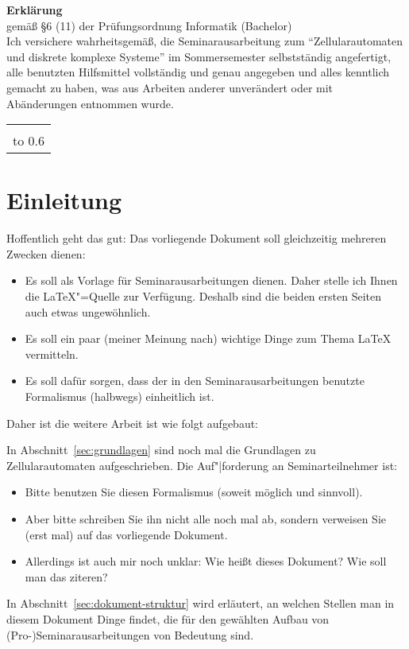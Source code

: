 {\thispagestyle{empty}\raggedright

\noindent \textbf{\Large Erklärung}\\[1ex]
gemäß \S 6 (11) der Prüfungsordnung Informatik %
(Bachelor) %
\\[\baselineskip]

\noindent
Ich versichere wahrheitsgemäß, die Seminarausarbeitung zum
\seminarart{} "`Zellularautomaten und diskrete komplexe Systeme"' im
Sommersemester \seminarjahr{} selbstständig angefertigt, alle
benutzten Hilfsmittel vollständig und genau angegeben und alles
kenntlich gemacht zu haben, was aus Arbeiten anderer unverändert oder
mit Abänderungen entnommen wurde.

\vspace*{30mm}
\noindent
\begin{tabular}{@{}l}
  \hline
   \\[-1ex]
  \hbox to 0.6\textwidth{(\teilnehmername, Matr.nr.~\teilnehmermatrnr) \hss}
\end{tabular}
}
\clearpage

\section{Einleitung}

Hoffentlich geht das gut: Das vorliegende Dokument soll gleichzeitig mehreren
Zwecken dienen:
%
\begin{itemize}[noitemsep]
\item Es soll als Vorlage für Seminarausarbeitungen dienen.
  Daher stelle ich Ihnen die \LaTeX"=Quelle zur Verfügung.
  Deshalb sind die beiden ersten Seiten auch etwas ungewöhnlich.
\item Es soll ein paar (meiner Meinung nach) wichtige Dinge zum Thema \LaTeX{}
  vermitteln.
\item Es soll dafür sorgen, dass der in den Seminarausarbeitungen benutzte
  Formalismus (halbwegs) einheitlich ist.
\end{itemize}
%
Daher ist die weitere Arbeit ist wie folgt aufgebaut: 

In Abschnitt~\ref{sec:grundlagen} sind noch mal die Grundlagen zu
Zellularautomaten aufgeschrieben. Die Auf"|forderung an Seminarteilnehmer ist:
%
\begin{itemize}[noitemsep]
\item Bitte benutzen Sie diesen Formalismus (soweit möglich und sinnvoll).
\item Aber bitte schreiben Sie ihn nicht alle noch mal ab, sondern verweisen
  Sie (erst mal) auf das vorliegende Dokument.
\item Allerdings ist auch mir noch unklar: Wie heißt dieses Dokument? Wie soll
  man das ziteren?
\end{itemize}
%
In Abschnitt~\ref{sec:dokument-struktur} wird erläutert, an welchen Stellen
man in diesem Dokument Dinge findet, die für den gewählten Aufbau von
(Pro-)Seminarausarbeitungen von Bedeutung sind.

